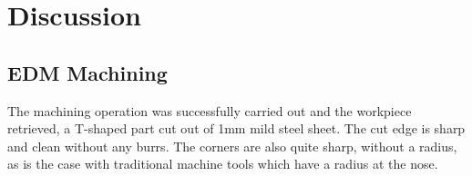 \section{Discussion}
\subsection{EDM Machining}
The machining operation was successfully carried out and the workpiece retrieved, a T-shaped part cut out of 1mm mild steel sheet. The cut edge is sharp and clean without any burrs. The corners are also quite sharp, without a radius, as is the case with traditional machine tools which have a radius at the nose.